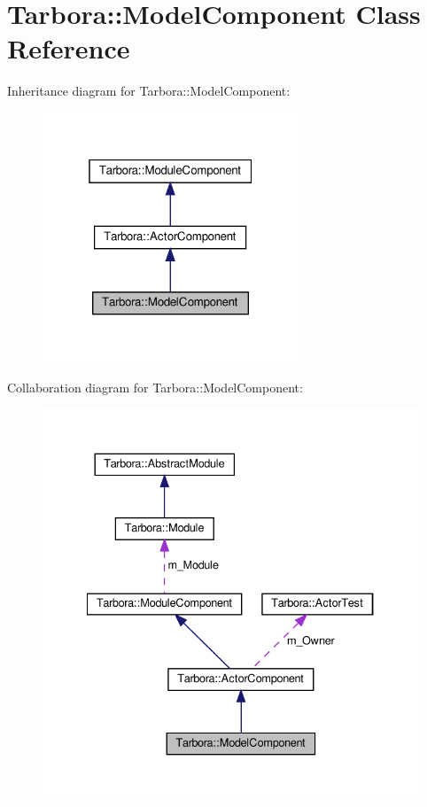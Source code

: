 \hypertarget{classTarbora_1_1ModelComponent}{}\section{Tarbora\+:\+:Model\+Component Class Reference}
\label{classTarbora_1_1ModelComponent}


Inheritance diagram for Tarbora\+:\+:Model\+Component\+:
\nopagebreak
\begin{figure}[H]
\begin{center}
\leavevmode
\includegraphics[width=217pt]{classTarbora_1_1ModelComponent__inherit__graph}
\end{center}
\end{figure}


Collaboration diagram for Tarbora\+:\+:Model\+Component\+:
\nopagebreak
\begin{figure}[H]
\begin{center}
\leavevmode
\includegraphics[width=334pt]{classTarbora_1_1ModelComponent__coll__graph}
\end{center}
\end{figure}
